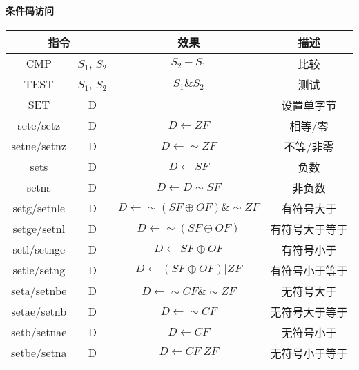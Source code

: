 \paragraph{条件码访问}
\begin{table}[H]
    \centering
    \begin{tabular}{|c c|c|c|}
        \hline
        \multicolumn{2}{|c|}{\textbf{指令}} & \textbf{效果}  & \textbf{描述}                                             \\
        \hline
        CMP                               & $S_1$, $S_2$ & $S_2-S_1$                                     & 比较      \\
        \hline
        TEST                              & $S_1$, $S_2$ & $S_1 \& S_2$                                  & 测试      \\
        \hline
        SET                               & D            &                                               & 设置单字节   \\
        \hline
        sete/setz                         & D            & $D \leftarrow ZF$                             & 相等/零    \\
        setne/setnz                       & D            & $D \leftarrow \sim ZF$                        & 不等/非零   \\
        \hline
        sets                              & D            & $D \leftarrow SF$                             & 负数      \\
        setns                             & D            & $D \leftarrow D \sim SF$                      & 非负数     \\
        \hline
        setg/setnle                       & D            & $D \leftarrow \sim (SF \oplus OF) \& \sim ZF$ & 有符号大于   \\
        setge/setnl                       & D            & $D \leftarrow \sim (SF \oplus OF)$            & 有符号大于等于 \\
        setl/setnge                       & D            & $D \leftarrow SF \oplus OF$                   & 有符号小于   \\
        setle/setng                       & D            & $D \leftarrow (SF \oplus OF) | ZF$            & 有符号小于等于 \\
        \hline
        seta/setnbe                       & D            & $D \leftarrow \sim CF \& \sim ZF$             & 无符号大于   \\
        setae/setnb                       & D            & $D \leftarrow \sim CF$                        & 无符号大于等于 \\
        setb/setnae                       & D            & $D \leftarrow CF$                             & 无符号小于   \\
        setbe/setna                       & D            & $D \leftarrow CF | ZF$                        & 无符号小于等于 \\
        \hline
    \end{tabular}
\end{table}

